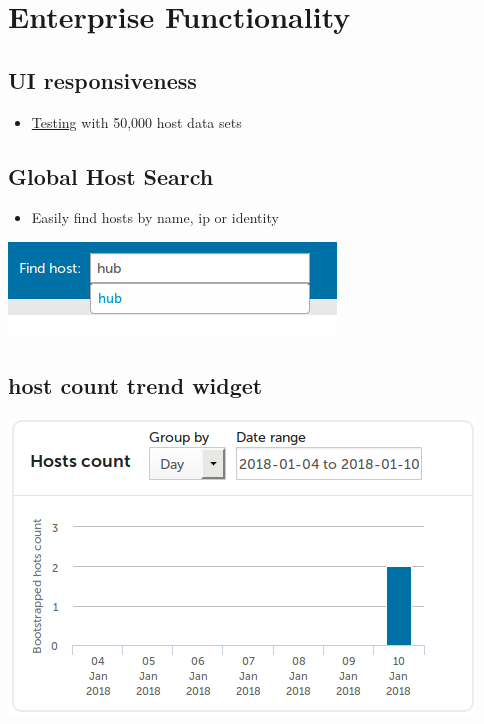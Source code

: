 \documentclass[11pt]{article}
\begin{document}
\section*{Enterprise Functionality}
\label{sec:org9c6b951}
\subsection*{UI responsiveness}
\label{sec:org8ab74c4}
\begin{itemize}
\item \href{data/75/971753-cddb-4739-a0a1-dcb66df44ab9/alert-status-speed-comparison.webm}{Testing} with 50,000 host data sets
\end{itemize}

\subsection*{Global Host Search}
\label{sec:org38b3292}
\begin{itemize}
\item Easily find hosts by name, ip or identity
\end{itemize}

\begin{center}
\includegraphics[width=.9\linewidth]{data/f9/7c9b4d-d46f-4aee-bd68-630f44106b0e/2018-01-14_Selection_002_2018-01-14_13-21-21.png}
\end{center}

\subsection*{host count trend widget}
\label{sec:orge7f5f71}
\begin{center}
\includegraphics[width=.9\linewidth]{data/e9/0e4df9-0bb7-4a1e-84d5-25911497f93c/2018-01-10_Selection_001_2018-01-14_12-02-44.png}
\end{center}
\end{document}
